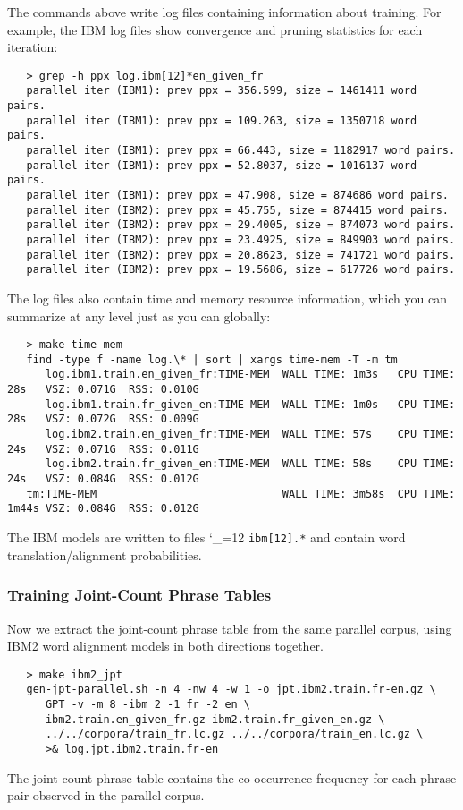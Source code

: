 \documentclass[11pt,letterpaper]{article}
\def\code{\begingroup\catcode`\_=12 \codex}
\newcommand{\codex}[1]{\texttt{#1}\endgroup}
\begin{document}
The commands above write log files containing information about training.  For
example, the IBM log files show convergence and pruning statistics for each
iteration:
\begin{small}
\begin{verbatim}
   > grep -h ppx log.ibm[12]*en_given_fr
   parallel iter (IBM1): prev ppx = 356.599, size = 1461411 word pairs.
   parallel iter (IBM1): prev ppx = 109.263, size = 1350718 word pairs.
   parallel iter (IBM1): prev ppx = 66.443, size = 1182917 word pairs.
   parallel iter (IBM1): prev ppx = 52.8037, size = 1016137 word pairs.
   parallel iter (IBM1): prev ppx = 47.908, size = 874686 word pairs.
   parallel iter (IBM2): prev ppx = 45.755, size = 874415 word pairs.
   parallel iter (IBM2): prev ppx = 29.4005, size = 874073 word pairs.
   parallel iter (IBM2): prev ppx = 23.4925, size = 849903 word pairs.
   parallel iter (IBM2): prev ppx = 20.8623, size = 741721 word pairs.
   parallel iter (IBM2): prev ppx = 19.5686, size = 617726 word pairs.
\end{verbatim}
\end{small}

The log files also contain time and memory resource information, which you can
summarize at any level just as you can globally:
\begin{footnotesize}
\begin{verbatim}
   > make time-mem
   find -type f -name log.\* | sort | xargs time-mem -T -m tm
      log.ibm1.train.en_given_fr:TIME-MEM  WALL TIME: 1m3s   CPU TIME: 28s   VSZ: 0.071G  RSS: 0.010G
      log.ibm1.train.fr_given_en:TIME-MEM  WALL TIME: 1m0s   CPU TIME: 28s   VSZ: 0.072G  RSS: 0.009G
      log.ibm2.train.en_given_fr:TIME-MEM  WALL TIME: 57s    CPU TIME: 24s   VSZ: 0.071G  RSS: 0.011G
      log.ibm2.train.fr_given_en:TIME-MEM  WALL TIME: 58s    CPU TIME: 24s   VSZ: 0.084G  RSS: 0.012G
   tm:TIME-MEM                             WALL TIME: 3m58s  CPU TIME: 1m44s VSZ: 0.084G  RSS: 0.012G
\end{verbatim}
\end{footnotesize}

The IBM models are written to files \code{ibm[12].*} and contain word
translation/alignment probabilities.

\subsubsection*{Training Joint-Count Phrase Tables}

Now we extract the joint-count phrase table from the same parallel corpus,
using IBM2 word alignment models in both directions together.
\begin{small}
\begin{verbatim}
   > make ibm2_jpt
   gen-jpt-parallel.sh -n 4 -nw 4 -w 1 -o jpt.ibm2.train.fr-en.gz \
      GPT -v -m 8 -ibm 2 -1 fr -2 en \
      ibm2.train.en_given_fr.gz ibm2.train.fr_given_en.gz \
      ../../corpora/train_fr.lc.gz ../../corpora/train_en.lc.gz \
      >& log.jpt.ibm2.train.fr-en
\end{verbatim}
\end{small}
The joint-count phrase table contains the co-occurrence frequency for
each phrase pair observed in the parallel corpus.
\end{document}
